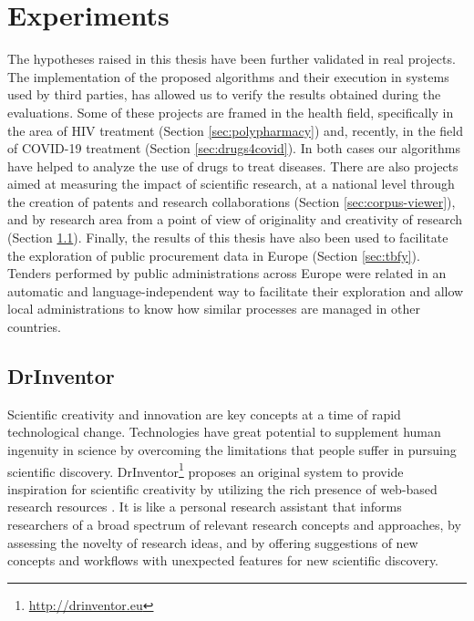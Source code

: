 

\chapter{Experiments}\label{ch:experiments}

\graphicspath{{experiments/figures/}}


The hypotheses raised in this thesis have been further validated in real projects. The implementation of the proposed algorithms and their execution in systems used by third parties, has allowed us to verify the results obtained during the evaluations. Some of these projects are framed in the health field, specifically in the area of HIV treatment (Section \ref{sec:polypharmacy}) and, recently, in the field of COVID-19 treatment (Section \ref{sec:drugs4covid}). In both cases our algorithms have helped to analyze the use of drugs to treat diseases. There are also projects aimed at measuring the impact of scientific research, at a national level through the creation of patents and research collaborations (Section \ref{sec:corpus-viewer}), and by research area from a point of view of originality and creativity of research (Section \ref{sec:drinventor}). Finally, the results of this thesis have also been used to facilitate the exploration of public procurement data in Europe (Section \ref{sec:tbfy}). Tenders performed by public administrations across Europe were related in an automatic and language-independent way to facilitate their exploration and allow local administrations to know how similar processes are managed in other countries.  

\section{DrInventor}
\label{sec:drinventor}

Scientific creativity and innovation are key concepts at a time of rapid technological change. Technologies have great potential to supplement human ingenuity in science by overcoming the limitations that people suffer in pursuing scientific discovery. DrInventor\footnote{\url{http://drinventor.eu}} proposes an original system to provide inspiration for scientific creativity by utilizing the rich presence of web-based research resources \citep{Dong2017DrIP}. It is like a personal research assistant that informs researchers of a broad spectrum of relevant research concepts and approaches, by assessing the novelty of research ideas, and by offering suggestions of new concepts and workflows with unexpected features for new scientific discovery.

